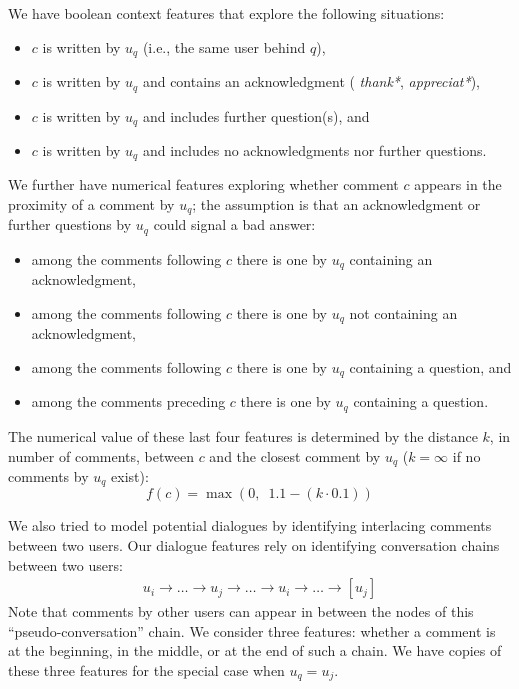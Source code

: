We have boolean context features that explore the following situations:

\begin{itemize}\setlength\itemsep{-0.4em}
\item $c$ is written by $u_q$ (i.e., the same user behind $q$),
\item \label{enu:context_ack} 
  $c$ is written by $u_q$ and contains an acknowledgment (\eg
  \textit{thank*}, \textit{appreciat*}),
\item \label{enu:context_quest}
  $c$ is written by $u_q$ and includes further question(s), and 
\item $c$ is written by $u_q$ and includes no acknowledgments nor further 
questions.
\end{itemize}
% 
We further have numerical features exploring whether comment $c$ appears in the proximity of a 
comment by $u_q$; the assumption is that an acknowledgment or further 
questions by $u_q$ could signal a bad answer:

\begin{itemize}\setlength\itemsep{-0.4em}
\item among the comments following $c$ there is one by $u_q$ containing 
an acknowledgment,
\item among the comments following $c$ there is one by $u_q$ not 
containing an acknowledgment,
\item among the comments following $c$ there is one by $u_q$ containing a 
question, and
\item among the comments preceding $c$ there is one by $u_q$ containing a 
question.
\end{itemize}

The numerical value of these last four features is determined by the distance $k$,
in number of comments, between $c$ and the closest comment by $u_q$
($k=\infty$ if no comments by $u_q$ exist):
% 
\begin{equation}
 f(c)=\max \left(0,\enspace 1.1-(k \cdot 0.1) \right)
\end{equation}
%

We also tried to model potential dialogues by identifying interlacing comments between two users.
Our dialogue features rely on identifying conversation chains between two users:
\begin{align*}
u_i \rightarrow \ldots \rightarrow 
u_j \rightarrow \ldots \rightarrow
u_i \rightarrow \ldots \rightarrow
[u_j]
\end{align*}
% 
Note that comments by other users can appear in between the nodes of this ``pseudo-conversation'' chain.
We consider three features:
whether a comment is at the beginning, in the middle, or at the end of such a chain.
We have copies of these three features for the special case when $u_q=u_j$. 

